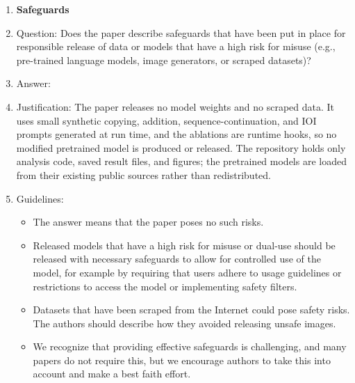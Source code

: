 \begin{enumerate}
\item {\bf Safeguards}
    \item[] Question: Does the paper describe safeguards that have been put in place for responsible release of data or models that have a high risk for misuse (e.g., pre-trained language models, image generators, or scraped datasets)?
    \item[] Answer: \answerNA{}
    \item[] Justification: The paper releases no model weights and no scraped data. It uses small synthetic copying, addition, sequence-continuation, and IOI prompts generated at run time, and the ablations are runtime hooks, so no modified pretrained model is produced or released. The repository holds only analysis code, saved result files, and figures; the pretrained models are loaded from their existing public sources rather than redistributed.
    \item[] Guidelines:
    \begin{itemize}
        \item The answer \answerNA{} means that the paper poses no such risks.
        \item Released models that have a high risk for misuse or dual-use should be released with necessary safeguards to allow for controlled use of the model, for example by requiring that users adhere to usage guidelines or restrictions to access the model or implementing safety filters. 
        \item Datasets that have been scraped from the Internet could pose safety risks. The authors should describe how they avoided releasing unsafe images.
        \item We recognize that providing effective safeguards is challenging, and many papers do not require this, but we encourage authors to take this into account and make a best faith effort.
    \end{itemize}


\end{enumerate}
